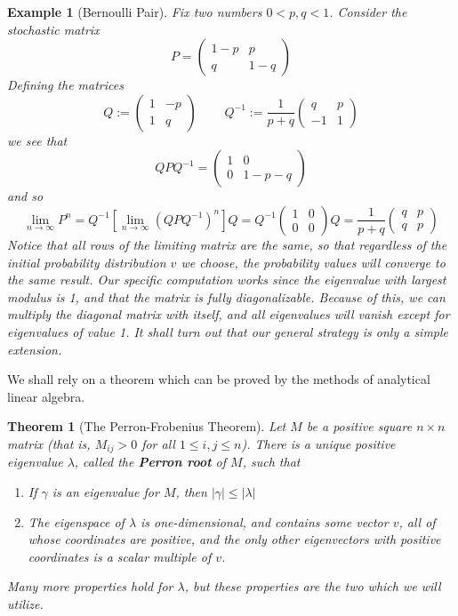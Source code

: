 \documentclass[12pt]{report}
\theoremstyle{plain}
\newtheorem{theorem}{Theorem}[chapter]
\newtheorem*{example}{Example}
\theoremstyle{definition}
\begin{document}
\begin{example}[Bernoulli Pair]
    Fix two numbers $0 < p,q < 1$. Consider the stochastic matrix
    \[ P = \begin{pmatrix} 1-p & p \\ q & 1-q \end{pmatrix} \]
    Defining the matrices
    \[ Q := \begin{pmatrix} 1 & -p \\ 1 & q \end{pmatrix}\ \ \ \ \ \ \ \ \ \ Q^{-1} := \frac{1}{p + q} \begin{pmatrix} q & p \\ -1 & 1 \end{pmatrix} \]
    we see that
    \[ QPQ^{-1} = \begin{pmatrix} 1 & 0 \\ 0 & 1-p-q \end{pmatrix} \]
    and so
    \[ \lim_{n \to \infty} P^n = Q^{-1} [\lim_{n \to \infty} (QPQ^{-1})^n] Q = Q^{-1} \begin{pmatrix} 1 & 0 \\ 0 & 0 \end{pmatrix} Q = \frac{1}{p + q} \begin{pmatrix} q & p \\ q & p \end{pmatrix} \]
    Notice that all rows of the limiting matrix are the same, so that regardless of the initial probability distribution $v$ we choose, the probability values will converge to the same result. Our specific computation works since the eigenvalue with largest modulus is 1, and that the matrix is fully diagonalizable. Because of this, we can multiply the diagonal matrix with itself, and all eigenvalues will vanish except for eigenvalues of value 1. It shall turn out that our general strategy is only a simple extension.
\end{example}

We shall rely on a theorem which can be proved by the methods of analytical linear algebra.

\begin{theorem}[The Perron-Frobenius Theorem]
    Let $M$ be a positive square $n \times n$ matrix (that is, $M_{ij} > 0$ for all $1 \leq i,j \leq n$). There is a unique positive eigenvalue $\lambda$, called the {\bf Perron root} of $M$, such that
    \begin{enumerate}
        \item If $\gamma$ is an eigenvalue for $M$, then $|\gamma| \leq |\lambda|$
        \item The eigenspace of $\lambda$ is one-dimensional, and contains some vector $v$, all of whose coordinates are positive, and the only other eigenvectors with positive coordinates is a scalar multiple of $v$.
    \end{enumerate}
    Many more properties hold for $\lambda$, but these properties are the two which we will utilize.
\end{theorem}
\end{document}
